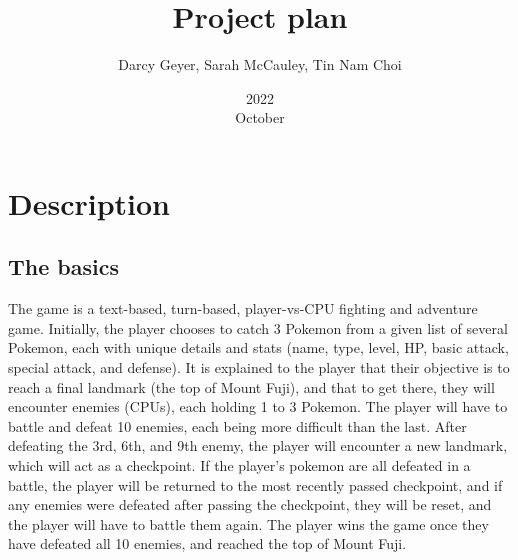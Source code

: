 \documentclass{article}
\title{Project plan}
\author{Darcy Geyer, Sarah McCauley, Tin Nam Choi}
\date{2022\\October}
\begin{document}
  \maketitle{}
  
  \tableofcontents{}
  \setlength{\parindent}{0em}
  \setlength{\parskip}{1em}
  
  \pagebreak
  
  \section{Description}
  
  \subsection{The basics}
  The game is a text-based, turn-based, player-vs-CPU fighting and adventure game. Initially, the player chooses to catch 3 Pokemon from a given list of several Pokemon, each with unique details and stats (name, type, level, HP, basic attack, special attack, and defense). It is explained to the player that their objective is to reach a final landmark (the top of Mount Fuji), and that to get there, they will encounter enemies (CPUs), each holding 1 to 3 Pokemon. The player will have to battle and defeat 10 enemies, each being more difficult than the last. After defeating the 3rd, 6th, and 9th enemy, the player will encounter a new landmark, which will act as a checkpoint. If the player's pokemon are all defeated in a battle, the player will be returned to the most recently passed checkpoint, and if any enemies were defeated after passing the checkpoint, they will be reset, and the player will have to battle them again. The player wins the game once they have defeated all 10 enemies, and reached the top of Mount Fuji.
  
\end{document}
